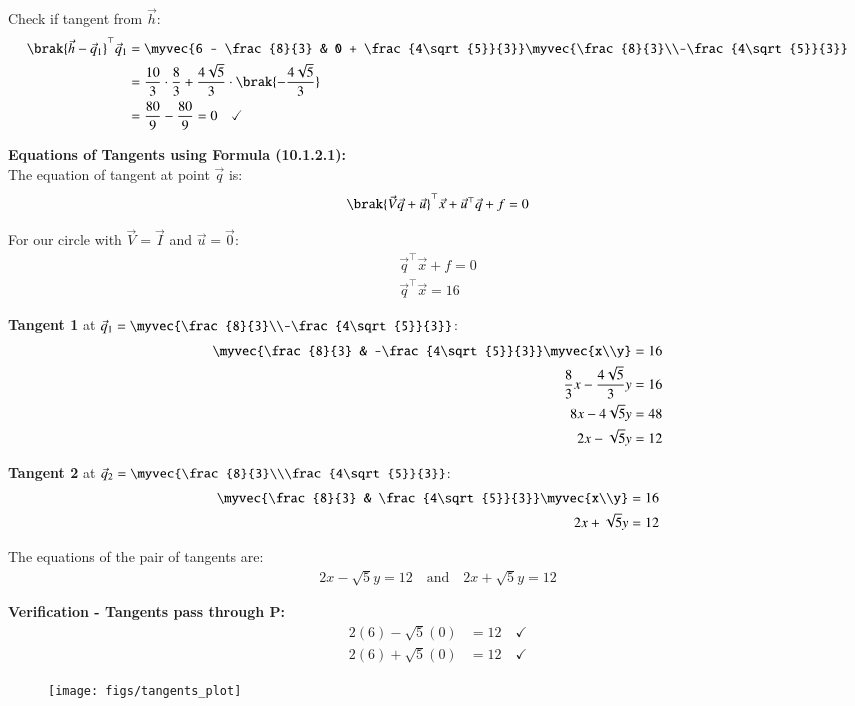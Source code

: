 \documentclass[article]{IEEEtran}
\begin{document}
	Check if tangent from $\vec{h}$:
	\begin{align}
		\brak{\vec{h} - \vec{q}_1}^\top\vec{q}_1 &= \myvec{6 - \frac{8}{3} & 0 + \frac{4\sqrt{5}}{3}}\myvec{\frac{8}{3}\\-\frac{4\sqrt{5}}{3}}\\
		&= \frac{10}{3} \cdot \frac{8}{3} + \frac{4\sqrt{5}}{3} \cdot \brak{-\frac{4\sqrt{5}}{3}}\\
		&= \frac{80}{9} - \frac{80}{9} = 0 \quad \checkmark
	\end{align}
	
	\textbf{Equations of Tangents using Formula (10.1.2.1):}\\
	The equation of tangent at point $\vec{q}$ is:
	\begin{align}
		\brak{\vec{V}\vec{q} + \vec{u}}^\top\vec{x} + \vec{u}^\top\vec{q} + f = 0
	\end{align}
	
	For our circle with $\vec{V} = \vec{I}$ and $\vec{u} = \vec{0}$:
	\begin{align}
		\vec{q}^\top\vec{x} + f = 0\\
		\vec{q}^\top\vec{x} = 16
	\end{align}
	
	\textbf{Tangent 1} at $\vec{q}_1 = \myvec{\frac{8}{3}\\-\frac{4\sqrt{5}}{3}}$:
	\begin{align}
		\myvec{\frac{8}{3} & -\frac{4\sqrt{5}}{3}}\myvec{x\\y} &= 16\\
		\frac{8}{3}x - \frac{4\sqrt{5}}{3}y &= 16\\
		8x - 4\sqrt{5}y &= 48\\
		2x - \sqrt{5}y &= 12
	\end{align}
	
	\textbf{Tangent 2} at $\vec{q}_2 = \myvec{\frac{8}{3}\\\frac{4\sqrt{5}}{3}}$:
	\begin{align}
		\myvec{\frac{8}{3} & \frac{4\sqrt{5}}{3}}\myvec{x\\y} &= 16\\
		2x + \sqrt{5}y &= 12
	\end{align}
	
	The equations of the pair of tangents are:
	\begin{align}
		\boxed{2x - \sqrt{5}y = 12 \quad \text{and} \quad 2x + \sqrt{5}y = 12}
	\end{align}
	
	\textbf{Verification - Tangents pass through P:}
	\begin{align}
		2(6) - \sqrt{5}(0) &= 12 \quad \checkmark\\
		2(6) + \sqrt{5}(0) &= 12 \quad \checkmark
	\end{align}
	
	\begin{figure}[H]
		\centering
		\texttt{[image: figs/tangents\_plot]}
	\end{figure}
	
\end{document}
